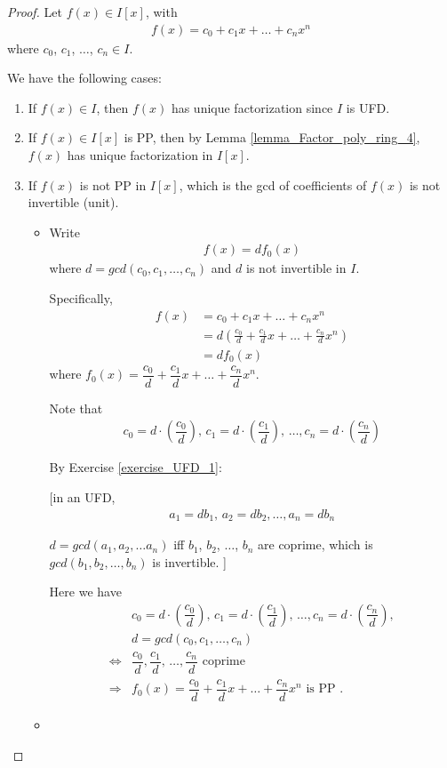 \documentclass[utf8]{ctexbook}
\theoremstyle{definition}
\begin{document}
\begin{proof}
Let $f(x) \in I[x]$, with
\begin{align*}
f(x) = c_0 + c_1 x + \ldots + c_n x^n
\end{align*}
where $c_0$, $c_1$, $\ldots$, $c_n \in I$.

We have the following cases:
\begin{enumerate}
\item{If $f(x) \in I$, then $f(x)$ has unique factorization since $I$ is UFD.}
\item{If $f(x) \in I[x]$ is PP, then by Lemma \ref{lemma_Factor_poly_ring_4}, $f(x)$ has unique factorization in $I[x]$.}
\item{If $f(x)$ is not PP in $I[x]$, which is the gcd of coefficients of $f(x)$ is not invertible (unit). 

\begin{itemize}
\item{Write
\begin{align*}
f(x) = d f_0 (x)
\end{align*}
where $d = gcd(c_0, c_1, \ldots, c_n)$ and $d$ is not invertible in $I$.

Specifically,
\begin{align*}
f(x) & = c_0 + c_1 x + \ldots + c_n x^n \\
& = d ( \frac{c_0}{d} + \frac{c_1}{d} x + \ldots + \frac{c_n}{d} x^n )\\
& = d f_0 (x)
\end{align*}
where $f_0 (x) = \dfrac{c_0}{d} + \dfrac{c_1}{d} x + \ldots + \dfrac{c_n}{d} x^n $.

Note that
\begin{align*}
c_0 = d \cdot (\dfrac{c_0}{d}), \, c_1 = d \cdot (\dfrac{c_1}{d}), \, \ldots, c_n = d \cdot (\dfrac{c_n}{d})
\end{align*}


By Exercise \ref{exercise_UFD_1}: 

[in an UFD, 
\begin{align*}
a_1 = d b_1, \, a_2 = d b_2, \ldots, a_n = d b_n
\end{align*}

$d = gcd(a_1, a_2, \ldots a_n)$ iff $b_1$, $b_2$, $\ldots$, $b_n$ are coprime, which is $gcd(b_1, b_2, \ldots, b_n)$ is invertible.
]

Here we have
\begin{align*}
& c_0 = d \cdot (\dfrac{c_0}{d}), \, c_1 = d \cdot (\dfrac{c_1}{d}), \, \ldots, c_n = d \cdot (\dfrac{c_n}{d}), \\
& d = gcd(c_0, c_1, \ldots, c_n) \\
\iff &  \dfrac{c_0}{d}, \dfrac{c_1}{d}, \, \ldots, \dfrac{c_n}{d} \mbox{ coprime} \\
\Longrightarrow &  f_0 (x) = \dfrac{c_0}{d} + \dfrac{c_1}{d} x + \ldots + \dfrac{c_n}{d} x^n  \mbox{ is PP .}
\end{align*}
}
\item{

}
\end{itemize}}
\end{enumerate}
\end{proof}
\end{document}
